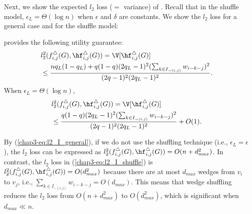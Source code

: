 Next, 
we show the expected $l_2$ loss ($=$ variance) of \AlgWSLE{}. 
Recall that in the shuffle model, $\epsilon_L = \Theta(\log n)$ when $\epsilon$ and $\delta$ are constants. 
We show 
the $l_2$ loss for a general case and for the shuffle model:
\begin{theorem}
\label{chap3-thm:l2-loss_I}
\AlgWSLE{} provides the following utility guarantee: 
\begin{align}
& l_2^2(f_{i,j}^\triangle(G), \hf_{i,j}^\triangle(G)) = \V[\hf_{i,j}^\triangle(G)] \nonumber\\ 
& \leq \frac{n q_L(1-q_L) + q(1-q)(2q_L-1)^2 (\sum_{k \in I_{-(i,j)}}w_{i-k-j})^2}{(2q-1)^2(2q_L-1)^2}.
\label{chap3-eq:l2_I_general}
\end{align}
When $\epsilon_L = \Theta(\log n)$, 
\begin{align}
& l_2^2(f_{i,j}^\triangle(G), \hf_{i,j}^\triangle(G)) = \V[\hf_{i,j}^\triangle(G)] \nonumber\\ 
& \leq \frac{q(1-q)(2q_L-1)^2 (\sum_{k \in I_{-(i,j)}}w_{i-k-j})^2}{(2q-1)^2(2q_L-1)^2} + O(1).
\label{chap3-eq:l2_I_shuffle}
\end{align}
\end{theorem}
By (\ref{chap3-eq:l2_I_general}), if we do not use the shuffling technique (i.e., $\epsilon_L = \epsilon$), the $l_2$ loss can be expressed as $l_2^2(f_{i,j}^\triangle(G), \hf_{i,j}^\triangle(G)) = O(n + d_{max}^2)$. 
In contrast, the $l_2$ loss in (\ref{chap3-eq:l2_I_shuffle}) is $l_2^2(f_{i,j}^\triangle(G), \hf_{i,j}^\triangle(G)) = O(d_{max}^2)$ because there are at most $d_{max}$ wedges from $v_i$ to $v_j$, i.e., $\sum_{k \in I_{-(i,j)}}w_{i-k-j} = O(d_{max})$. 
This means that wedge shuffling reduces the $l_2$ loss from $O(n + d_{max}^2)$ to $O(d_{max}^2)$, which is significant when $d_{max} \ll n$. 

